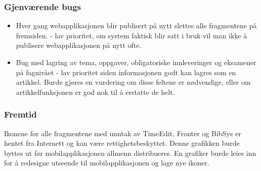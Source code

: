 \documentclass[../main.tex]{subfiles}
\begin{document}
\subsubsection{Gjenværende bugs}

\begin{itemize}
\item Hver gang webapplikasjonen blir publisert på nytt slettes alle fragmentene på fremsiden. - lav prioritet, om system faktisk blir satt i bruk vil man ikke å publisere webapplikasjonen på nytt ofte.
\item Bug med lagring av tema, oppgaver, obligatoriske innleveringer og eksamener på fagnivået - lav prioritet siden informasjonen godt kan lagres som en artikkel. Burde gjøres en vurdering om disse feltene er nødvendige, eller om artikkelfunksjonen er god nok til å erstatte de helt.
\end{itemize}

\subsubsection{Fremtid}

Ikonene for alle fragmentene med unntak av TimeEdit, Fronter og BibSys er hentet fra Internett og kan være rettighetsbeskyttet. Denne grafikken burde byttes ut før mobilapplikasjonen allmenn distribueres. En grafiker burde leies inn for å redesigne utseende til mobilapplikasjonen og lage nye ikoner.

\newpage
\end{document}
